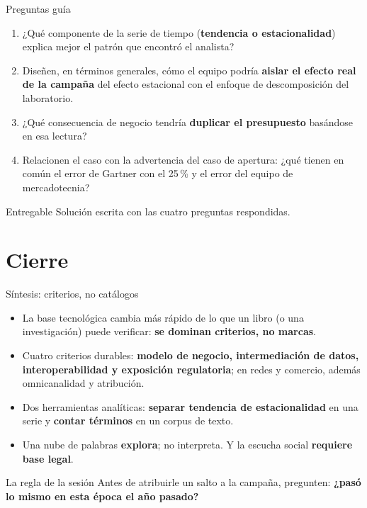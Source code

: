 \documentclass[aspectratio=169,xcolor=dvipsnames]{beamer}
\begin{document}
\begin{frame}{Preguntas guía}
\small
\begin{enumerate}
  \item ¿Qué componente de la serie de tiempo (\textbf{tendencia o estacionalidad}) explica mejor el patrón que encontró el analista?
  \vspace{3pt}
  \item Diseñen, en términos generales, cómo el equipo podría \textbf{aislar el efecto real de la campaña} del efecto estacional con el enfoque de descomposición del laboratorio.
  \vspace{3pt}
  \item ¿Qué consecuencia de negocio tendría \textbf{duplicar el presupuesto} basándose en esa lectura?
  \vspace{3pt}
  \item Relacionen el caso con la advertencia del caso de apertura: ¿qué tienen en común el error de Gartner con el 25\,\% y el error del equipo de mercadotecnia?
\end{enumerate}
\begin{alertblock}{Entregable}
  \small Solución escrita con las cuatro preguntas respondidas.
\end{alertblock}
\end{frame}

\section{Cierre}

\begin{frame}{Síntesis: criterios, no catálogos}
\begin{itemize}
  \small
  \item La base tecnológica cambia más rápido de lo que un libro (o una investigación) puede verificar: \textbf{se dominan criterios, no marcas}.
  \item Cuatro criterios durables: \textbf{modelo de negocio, intermediación de datos, interoperabilidad y exposición regulatoria}; en redes y comercio, además omnicanalidad y atribución.
  \item Dos herramientas analíticas: \textbf{separar tendencia de estacionalidad} en una serie y \textbf{contar términos} en un corpus de texto.
  \item Una nube de palabras \textbf{explora}; no interpreta. Y la escucha social \textbf{requiere base legal}.
\end{itemize}
\vspace{4pt}
\begin{alertblock}{La regla de la sesión}
  \small Antes de atribuirle un salto a la campaña, pregunten: \textbf{¿pasó lo mismo en esta época el año pasado?}
\end{alertblock}
\end{frame}
\end{document}
